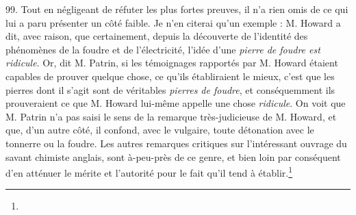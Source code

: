 \documentclass[a4paper, 11pt, oneside, polutonikogreek, french]{article}
\begin{document}
99. Tout en négligeant de réfuter les plus fortes preuves, il n'a rien omis de ce qui lui a paru présenter un côté faible. Je n'en citerai qu'un exemple : M. Howard a dit, avec raison, que \og certainement, depuis la découverte de l'identité des phénomènes de la foudre et de l'électricité, l'idée d'une \emph{pierre de foudre est ridicule}. \fg \og Or, dit M. Patrin, si les témoignages rapportés par M. Howard étaient capables de prouver quelque chose, ce qu'ils établiraient le mieux, c'est que les pierres dont il s'agit sont de véritables \emph{pierres de foudre}, et conséquemment ils prouveraient ce que M. Howard lui-même appelle une chose \emph{ridicule}. \fg On voit que M. Patrin n'a pas saisi le sens de la remarque très-judicieuse de M. Howard, et que, d'un autre côté, il confond, avec le vulgaire, toute détonation avec le tonnerre ou la foudre. Les autres remarques critiques sur l'intéressant ouvrage du savant chimiste anglais, sont à-peu-près de ce genre, et bien loin par conséquent d'en atténuer le mérite et l'autorité pour le fait qu'il tend à établir.\footnote{}
\end{document}
